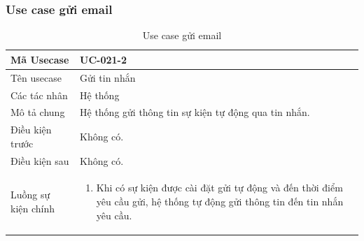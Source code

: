 \documentclass[12pt,a4paper]{article}
\begin{document}
    \subsubsection*{Use case gửi email}
    \begin{table}[H]
        \centering
        \begin{tabular}{|p{3.5cm}|p{11.5cm}|c|}
            \hline
            Mã Usecase      & UC-021-2                                             \\
            \hline
            Tên usecase     & Gửi tin nhắn                                         \\
            \hline
            Các tác nhân    & Hệ thống                                             \\
            \hline
            Mô tả chung     & Hệ thống gửi thông tin sự kiện tự động qua tin nhắn. \\
            \hline

            Điều kiện trước & Không có.                                            \\
            \hline

            Điều kiện sau   & Không có.                                            \\
            \hline

            Luồng sự kiện chính & \vspace{-.8cm}\begin{enumerate}
                                                    \item Khi có sự kiện được cài đặt gửi tự động và đến thời điểm yêu cầu gửi, hệ thống tự động gửi thông tin đến tin nhắn yêu cầu.
            \end{enumerate}
            \\
            \hline
        \end{tabular}
        \caption{Use case gửi email}

    \end{table}


\end{document}
